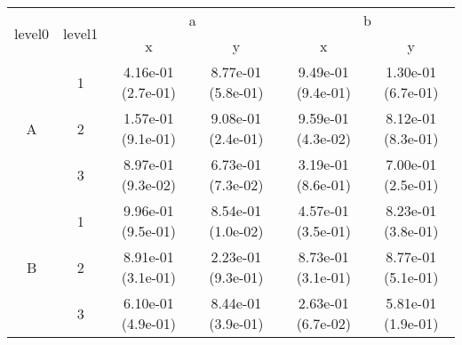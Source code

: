 \begin{tabular}{cccccc}
\toprule
\multirow{2}{*}{level0} & \multirow{2}{*}{level1}&\multicolumn{2}{c}{a}&\multicolumn{2}{c}{b}\tabularnewline
\cmidrule(lr){3-4}
\cmidrule(lr){5-6}
&&x&y&x&y\tabularnewline
\midrule
\multirow{3}{*}{A}&1& 4.16e-01 (2.7e-01)& 8.77e-01 (5.8e-01)& 9.49e-01 (9.4e-01)& 1.30e-01 (6.7e-01)\tabularnewline
&2& 1.57e-01 (9.1e-01)& 9.08e-01 (2.4e-01)& 9.59e-01 (4.3e-02)& 8.12e-01 (8.3e-01)\tabularnewline
&3& 8.97e-01 (9.3e-02)& 6.73e-01 (7.3e-02)& 3.19e-01 (8.6e-01)& 7.00e-01 (2.5e-01)\tabularnewline
\midrule
\multirow{3}{*}{B}&1& 9.96e-01 (9.5e-01)& 8.54e-01 (1.0e-02)& 4.57e-01 (3.5e-01)& 8.23e-01 (3.8e-01)\tabularnewline
&2& 8.91e-01 (3.1e-01)& 2.23e-01 (9.3e-01)& 8.73e-01 (3.1e-01)& 8.77e-01 (5.1e-01)\tabularnewline
&3& 6.10e-01 (4.9e-01)& 8.44e-01 (3.9e-01)& 2.63e-01 (6.7e-02)& 5.81e-01 (1.9e-01)\tabularnewline
\bottomrule
\end{tabular}
